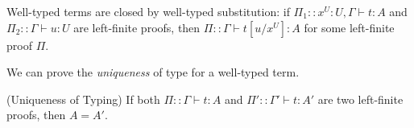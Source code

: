 \begin{proposition}
Well-typed terms are closed by well-typed substitution:
if $\Pi_1:: x^U:U, \Gamma \vdash t:A$ and $\Pi_2:: \Gamma \vdash u:U$
are left-finite proofs,
then $\Pi::\Gamma \vdash t[u/x^U]:A$ for some left-finite proof $\Pi$.
\end{proposition}

%
%

We can prove the \emph{uniqueness} of type for a well-typed term. 


\begin{proposition}(Uniqueness of Typing)
\label{proposition-left-finite-unique}
If both $\Pi::\Gamma \vdash t:A$ and $\Pi'::\Gamma' \vdash t:A'$ are two left-finite proofs,
then $A = A'$.
\end{proposition}

